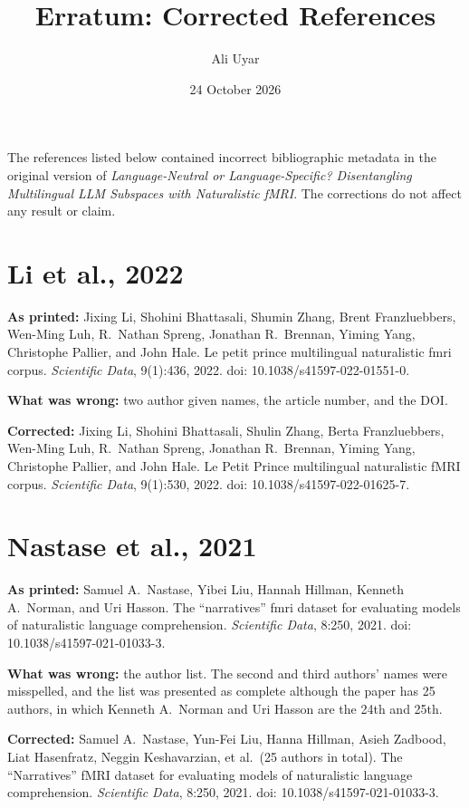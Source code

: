 \documentclass[11pt]{article}
\title{Erratum: Corrected References}
\author{Ali Uyar}
\date{24 October 2026}
\begin{document}
\maketitle

The references listed below contained incorrect bibliographic metadata in the original version of
\emph{Language-Neutral or Language-Specific? Disentangling Multilingual LLM Subspaces with Naturalistic fMRI}.
The corrections do not affect any result or claim.

\section*{Li et al., 2022}
\textbf{As printed:} Jixing Li, Shohini Bhattasali, Shumin Zhang, Brent Franzluebbers, Wen-Ming Luh, R.\ Nathan Spreng, Jonathan R.\ Brennan, Yiming Yang, Christophe Pallier, and John Hale. Le petit prince multilingual naturalistic fmri corpus. \emph{Scientific Data}, 9(1):436, 2022. doi: 10.1038/s41597-022-01551-0.

\textbf{What was wrong:} two author given names, the article number, and the DOI.

\textbf{Corrected:} Jixing Li, Shohini Bhattasali, Shulin Zhang, Berta Franzluebbers, Wen-Ming Luh, R.\ Nathan Spreng, Jonathan R.\ Brennan, Yiming Yang, Christophe Pallier, and John Hale. Le Petit Prince multilingual naturalistic fMRI corpus. \emph{Scientific Data}, 9(1):530, 2022. doi: 10.1038/s41597-022-01625-7.

\section*{Nastase et al., 2021}
\textbf{As printed:} Samuel A.\ Nastase, Yibei Liu, Hannah Hillman, Kenneth A.\ Norman, and Uri Hasson. The ``narratives'' fmri dataset for evaluating models of naturalistic language comprehension. \emph{Scientific Data}, 8:250, 2021. doi: 10.1038/s41597-021-01033-3.

\textbf{What was wrong:} the author list. The second and third authors' names were misspelled, and the list was presented as complete although the paper has 25 authors, in which Kenneth A.\ Norman and Uri Hasson are the 24th and 25th.

\textbf{Corrected:} Samuel A.\ Nastase, Yun-Fei Liu, Hanna Hillman, Asieh Zadbood, Liat Hasenfratz, Neggin Keshavarzian, et al.\ (25 authors in total). The ``Narratives'' fMRI dataset for evaluating models of naturalistic language comprehension. \emph{Scientific Data}, 8:250, 2021. doi: 10.1038/s41597-021-01033-3.
\end{document}
